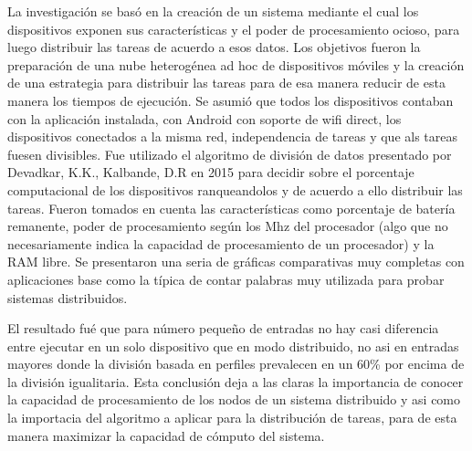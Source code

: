 \par
La investigación se basó en la creación de un sistema mediante el cual los dispositivos exponen sus características y el poder de procesamiento ocioso, para luego distribuir las tareas de acuerdo a esos datos.
Los objetivos fueron la preparación de una nube heterogénea ad hoc de dispositivos móviles y la creación de una estrategia para distribuir las tareas para de esa manera reducir de esta manera los tiempos de ejecución.
Se asumió que todos los dispositivos contaban con la aplicación instalada, con Android con soporte de wifi direct, los dispositivos conectados a la misma red, independencia de tareas y que als tareas fuesen divisibles. Fue utilizado el algoritmo de división de datos presentado por Devadkar, K.K., Kalbande, D.R en 2015 para decidir sobre el porcentaje computacional de los dispositivos ranqueandolos y de acuerdo a ello distribuir las tareas. Fueron tomados en cuenta las características como porcentaje de batería remanente, poder de procesamiento según los Mhz del procesador (algo que no necesariamente indica la capacidad de procesamiento de un procesador) y la RAM libre. Se presentaron una seria de gráficas comparativas muy completas con aplicaciones base como la típica de contar palabras muy utilizada para probar sistemas distribuidos.\par
El resultado fué que para número pequeño de entradas no hay casi diferencia entre ejecutar en un solo dispositivo que en modo distribuido, no asi en entradas mayores donde la división basada en perfiles prevalecen en un 60\% por encima de la división igualitaria.
Esta conclusión deja a las claras la importancia de conocer la capacidad de procesamiento de los nodos de un sistema distribuido y asi como la importacia del algoritmo a aplicar para la distribución de tareas, para de esta manera maximizar la capacidad de cómputo del sistema.\par
